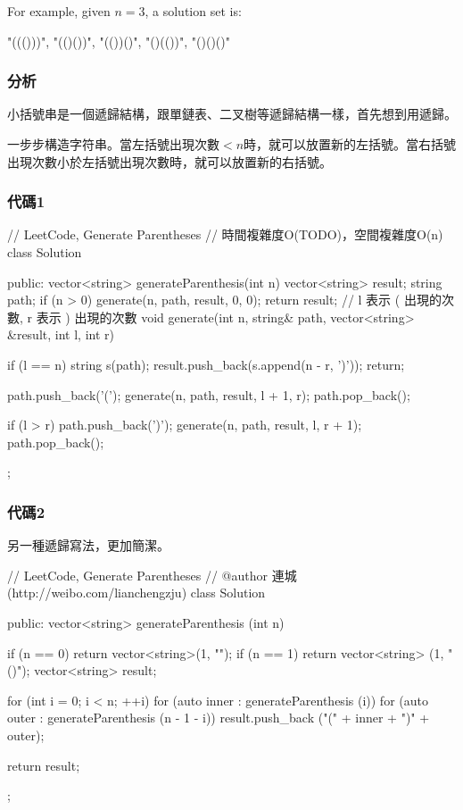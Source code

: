 For example, given $n = 3$, a solution set is:
\begin{Code}
"((()))", "(()())", "(())()", "()(())", "()()()"
\end{Code}

\subsubsection{分析}
小括號串是一個遞歸結構，跟單鏈表、二叉樹等遞歸結構一樣，首先想到用遞歸。

一步步構造字符串。當左括號出現次數$<n$時，就可以放置新的左括號。當右括號出現次數小於左括號出現次數時，就可以放置新的右括號。


\subsubsection{代碼1}
\begin{Code}
// LeetCode, Generate Parentheses
// 時間複雜度O(TODO)，空間複雜度O(n)
class Solution {
public:
    vector<string> generateParenthesis(int n) {
        vector<string> result;
        string path;
        if (n > 0) generate(n, path, result, 0, 0);
        return result;
    }
    // l 表示 ( 出現的次數, r 表示 ) 出現的次數
    void generate(int n, string& path, vector<string> &result, int l, int r) {
        if (l == n) {
            string s(path);
            result.push_back(s.append(n - r, ')'));
            return;
        }
        
        path.push_back('(');
        generate(n, path, result, l + 1, r);
        path.pop_back();

        if (l > r) {
            path.push_back(')');
            generate(n, path, result, l, r + 1);
            path.pop_back();
        }
    }
};
\end{Code}


\subsubsection{代碼2}
另一種遞歸寫法，更加簡潔。
\begin{Code}
// LeetCode, Generate Parentheses
// @author 連城 (http://weibo.com/lianchengzju)
class Solution {
public:
    vector<string> generateParenthesis (int n) {
        if (n == 0) return vector<string>(1, "");
        if (n == 1) return vector<string> (1, "()");
        vector<string> result;

        for (int i = 0; i < n; ++i)
            for (auto inner : generateParenthesis (i))
                for (auto outer : generateParenthesis (n - 1 - i))
                    result.push_back ("(" + inner + ")" + outer);

        return result;
    }
};
\end{Code}



